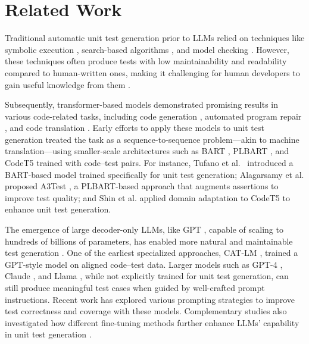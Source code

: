 \documentclass[acmsmall]{acmart}
\begin{document}
\section{Related Work}
\label{sec:related_work}
Traditional automatic unit test generation prior to LLMs relied on techniques like symbolic execution \cite{symbolic-execution-test-gen-1, symbolic-execution-test-gen-2}, search-based algorithms \cite{Evosuite, pynguin}, and model checking \cite{Model-checking-test-gen-2, Model-checking-test-gen-1}. However, these techniques often produce tests with low maintainability and readability compared to human-written ones, making it challenging for human developers to gain useful knowledge from them \cite{OnLLMUTGenEvalASE2024}.

Subsequently, transformer-based models \cite{vaswani2023attentionneed} demonstrated promising results in various code-related tasks, including code generation \cite{Codex}, automated program repair \cite{CoT-for-APR}, and code translation \cite{Code_translation_llm}. Early efforts to apply these models to unit test generation treated the task as a sequence-to-sequence problem—akin to machine translation—using smaller-scale architectures such as BART \cite{lewis-etal-2020-bart}, PLBART \cite{ahmad-etal-2021-PLBART}, and CodeT5 \cite{wang2021codet5} trained with code--test pairs. For instance, Tufano et al.~\cite{UnitTestCaseGenTrans} introduced a BART-based model trained specifically for unit test generation; Alagarsamy et al. proposed A3Test \cite{A3TestIST}, a PLBART-based approach that augments assertions to improve test quality; and Shin et al. \cite{codet5domainadaptUT} applied domain adaptation to CodeT5 to enhance unit test generation.

The emergence of large decoder-only LLMs, like GPT \cite{LMareFew-Shot-Learner}, capable of scaling to hundreds of billions of parameters, has enabled more natural and maintainable test generation \cite{pan2025asternaturalmultilanguageunit}. One of the earliest specialized approaches, CAT-LM \cite{CAT-LMASE2023}, trained a GPT-style model on aligned code--test data. Larger models such as GPT-4 \cite{openai2024gpt4ocard}, Claude \cite{anthropic2024claude3}, and Llama \cite{Llama}, while not explicitly trained for unit test generation, can still produce meaningful test cases when guided by well-crafted prompt instructions. Recent work has explored various prompting strategies to improve test correctness \cite{LLMforJunitTestGenEASE2024, Few-shot-test-gen, CODAMOSAICSE2023} and coverage \cite{HITS:HighCoveLLMUTGen, AutoTestImprvMetaFSE2024, coverup} with these models. Complementary studies also investigated how different fine-tuning methods further enhance LLMs' capability in unit test generation \cite{FintuningLLMforUT, storhaug2024parameterefficientfinetuninglargelanguage}.
\end{document}
